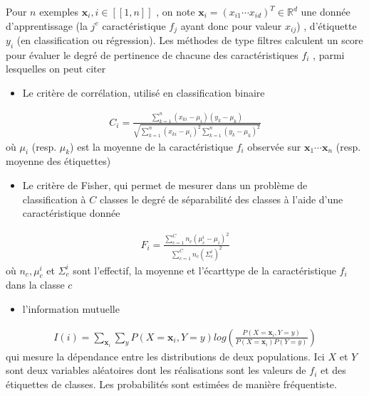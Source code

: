 \documentclass[letterpaper,10pt,english]{jupyterBook}
\begin{document}
\sphinxAtStartPar
Pour \(n\) exemples  \(\mathbf x_i, i\in[\![1,n]\!]\) , on note \(\mathbf x_i=\left (x_{i1} \cdots x_{id} \right )^T\in\mathbb{R}^d\)  une donnée d’apprentissage (la \(j^e\) caractéristique \(f_j\) ayant donc pour valeur \(x_{ij}\)) , d’étiquette \(y_i\) (en classification ou régression). Les méthodes de type filtres calculent un score pour évaluer le degré de pertinence de chacune des caractéristiques \(f_i\) , parmi lesquelles on peut citer
\begin{itemize}
\item {} 
\sphinxAtStartPar
Le critère de corrélation, utilisé en classification binaire

\end{itemize}
\begin{equation*}
\begin{split}C_i =\frac{\displaystyle\sum_{k=1}^n\left (x_{ki} -\mu_i\right )\left (y_{k} -\mu_k\right )}{\sqrt{\displaystyle\sum_{k=1}^n\left (x_{ki} -\mu_i\right )^2\displaystyle\sum_{k=1}^n\left (y_{k} -\mu_k\right )^2}}\end{split}
\end{equation*}
\sphinxAtStartPar
où \(\mu_i\) (resp. \(\mu_k\)) est la moyenne de la caractéristique \(f_i\) observée sur \(\mathbf x_1\cdots \mathbf x_n\) (resp. moyenne des étiquettes)
\begin{itemize}
\item {} 
\sphinxAtStartPar
Le critère de Fisher,  qui permet de mesurer dans un problème de classification à \(C\) classes le degré de séparabilité des classes à l’aide
d’une caractéristique donnée

\end{itemize}
\begin{equation*}
\begin{split}F_i = \frac{\displaystyle\sum_{c=1}^C n_c\left (\mu_c^i-\mu_i \right )^2}{\displaystyle\sum_{c=1}^C n_c(\Sigma_c^i)^2}\end{split}
\end{equation*}
\sphinxAtStartPar
où \(n_c, \mu_c^i\) et \(\Sigma_c^i\) sont l’effectif, la moyenne et l’écart\sphinxhyphen{}type de la caractéristique  \(f_i\) dans la classe \(c\)
\begin{itemize}
\item {} 
\sphinxAtStartPar
l’information mutuelle

\end{itemize}
\begin{equation*}
\begin{split}I(i) = \displaystyle\sum_{\mathbf x_i} \displaystyle\sum_{y}P(X=\mathbf x_i,Y=y)log\left ( \frac{P(X=\mathbf x_i,Y=y)}{P(X=\mathbf x_i)P(Y=y)}\right )\end{split}
\end{equation*}
\sphinxAtStartPar
qui mesure la dépendance entre les distributions de deux populations. Ici \(X\) et \(Y\) sont deux variables aléatoires dont les réalisations sont les valeurs de \(f_i\) et des étiquettes de classes. Les probabilités sont estimées de manière fréquentiste.
\end{document}
